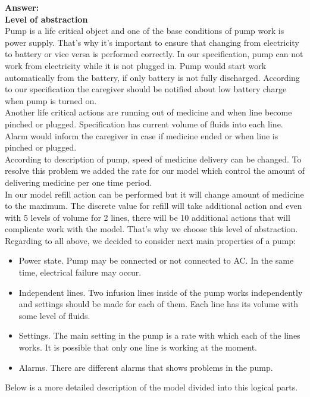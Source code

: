 \documentclass{article}
\begin{document}
\textbf{Answer:}\\

\textbf{Level of abstraction}\\

Pump is a life critical object and one of the base conditions of pump work is power supply. That's why it's important to ensure that changing from electricity to battery or vice versa is performed correctly. In our specification, pump can not work from electricity while it is not plugged in. Pump would start work automatically from the battery, if only battery is not fully discharged. According to our specification the caregiver should be notified about low battery charge when pump is turned on. \\
Another life critical actions are running out of medicine and when line become pinched or plugged. Specification has current volume of fluids into each line. Alarm would inform the caregiver in case if medicine ended or when line is pinched or plugged. \\
According to description of pump, speed of medicine delivery can be changed. To resolve this problem we added the rate for our model which control the amount of delivering medicine per one time period. \\
In our model refill action can be performed but it will change amount of medicine to the maximum. The discrete value for refill will take additional action and even with 5 levels of volume for 2 lines, there will be 10 additional actions that will complicate work with the model. That's why we choose this level of abstraction. \\

Regarding to all above, we decided to consider next main properties of a pump: \\
\begin{itemize}
	\item Power state. Pump may be connected or not connected to AC. In the same time, electrical failure may occur.
	\item Independent lines. Two infusion lines inside of the pump works independently and settings should be made for each of them. Each line has its volume with some level of fluids. 
	\item Settings. The main setting in the pump is a rate with which each of the lines works. It is possible that only one line is working at the moment.
	\item Alarms. There are different alarms that shows problems in the pump.
\end{itemize}
Below is a more detailed description of the model divided into this logical parts.\\
\end{document}

